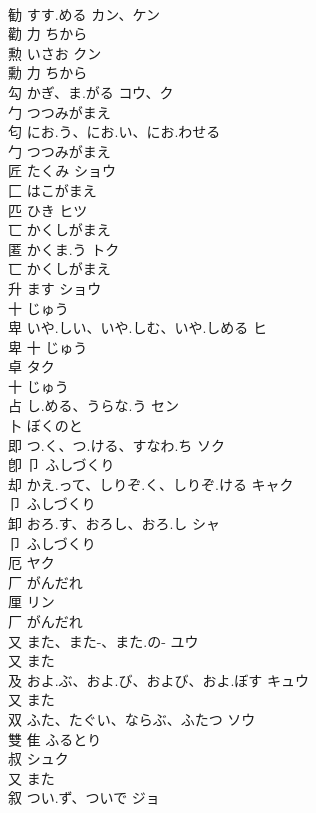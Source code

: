 \documentclass[8pt]{extreport}
\begin{document}
\begin{CJK}{UTF8}{min}
\\	勧	すす.める	カン、ケン	
\\	勸	力		ちから		
\\	勲	いさお	クン	
\\	勳	力		ちから		
\\	勾	かぎ、ま.がる	コウ、ク	
\\	勹		つつみがまえ		
\\	匂	にお.う、にお.い、にお.わせる		
\\	勹		つつみがまえ		
\\	匠	たくみ	ショウ	
\\	匚		はこがまえ		
\\	匹	ひき	ヒツ	
\\	匸		かくしがまえ		
\\	匿	かくま.う	トク	
\\	匸		かくしがまえ		
\\	升	ます	ショウ	
\\	十		じゅう		
\\	卑	いや.しい、いや.しむ、いや.しめる	ヒ	
\\	卑	十		じゅう		
\\	卓		タク	
\\	十		じゅう		
\\	占	し.める、うらな.う	セン	
\\	卜		ぼくのと		
\\	即	つ.く、つ.ける、すなわ.ち	ソク	
\\	卽	卩		ふしづくり		
\\	却	かえ.って、しりぞ.く、しりぞ.ける	キャク	
\\	卩		ふしづくり		
\\	卸	おろ.す、おろし、おろ.し	シャ	
\\	卩		ふしづくり		
\\	厄		ヤク	
\\	厂		がんだれ		
\\	厘		リン	
\\	厂		がんだれ		
\\	又	また、また-、また.の-	ユウ	
\\	又		また		
\\	及	およ.ぶ、およ.び、および、およ.ぼす	キュウ	
\\	又		また		
\\	双	ふた、たぐい、ならぶ、ふたつ	ソウ	
\\	雙	隹		ふるとり		
\\	叔		シュク	
\\	又		また		
\\	叙	つい.ず、ついで	ジョ	

\end{CJK}
\end{document}

